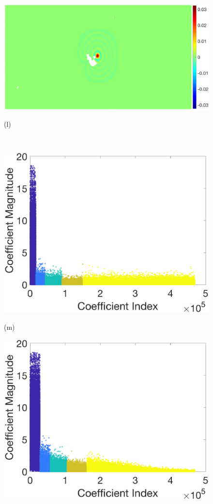 \documentclass[journal, 10pt]{IEEEtran}
\begin{document}
\begin{figure}[tb]
\begin{minipage}[m]{0.24\linewidth}
\centerline{\includegraphics[width=.9\linewidth]{fig_temp_scaling_zoom}}
\centerline{\small{(l)}}
\end{minipage} \medskip \\
\begin{minipage}[m]{0.24\linewidth}
\centerline{\includegraphics[width=.9\linewidth]{fig_temp_analysis_coeffs}}
\centerline{\small{(m)}}
\end{minipage}
\begin{minipage}[m]{0.24\linewidth}
\centerline{\includegraphics[width=.9\linewidth]{fig_temp_analysis_coeffs_adapted}}

\end{minipage}
\end{figure}
\end{document}
